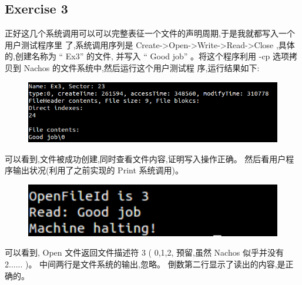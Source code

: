 \documentclass[nofonts]{ctexart}
\begin{document}
\subsection*{Exercise 3}
正好这几个系统调用可以可以完整表征一个文件的声明周期,于是我就都写入一个用户测试程序里
了,系统调用序列是 Create->Open->Write->Read->Close ,具体的,创建名称为 “ Ex3” 的文件,
并写入 “ Good job” 。将这个程序利用 -cp 选项拷贝到 Nachos 的文件系统中,然后运行这个用户测试程
序,运行结果如下:
\begin{figure}[h!]
\includegraphics[width=5in]{e31.png}
\end{figure}
可以看到,文件被成功创建,同时查看文件内容,证明写入操作正确。
然后看用户程序输出状况(利用了之前实现的 Print 系统调用)。

\begin{figure}[h!]
\includegraphics[width=5in]{e32.png}
\end{figure}
可以看到, Open 文件返回文件描述符 3 ( 0,1,2, 预留,虽然 Nachos 似乎并没有 2...... )。
中间两行是文件系统的输出,忽略。
倒数第二行显示了读出的内容,是正确的。
\end{document}
